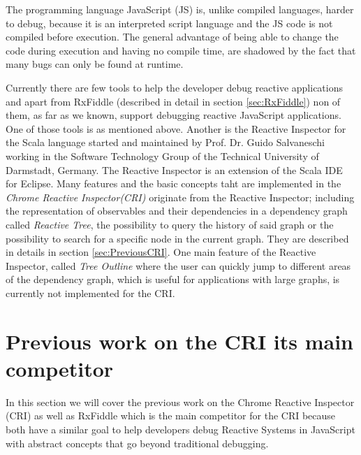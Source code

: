 
The programming language JavaScript (JS) is, unlike compiled languages, harder to debug, because it is an interpreted script language and the JS code is not compiled before execution. The general advantage of being able to change the code during execution and having no compile time, are shadowed by the fact that many bugs can only be found at runtime. 


Currently there are few tools to help the developer debug reactive applications and apart from RxFiddle (described in detail in section \ref{sec:RxFiddle}) non of them, as far as we known, support debugging reactive JavaScript applications. One of those tools is \cite{ShinyGraphFromLog} as mentioned above. Another is the Reactive Inspector for the Scala language \cite{ReactiveInspector} started and maintained by Prof. Dr. Guido Salvaneschi working in the Software Technology Group of the Technical University of Darmstadt, Germany.
The Reactive Inspector is an extension of the Scala IDE for Eclipse. Many features and the basic concepts taht are implemented in the \emph{Chrome Reactive Inspector(CRI)} originate from the Reactive Inspector; including the representation of observables and their dependencies in a dependency graph called \emph{Reactive Tree}, the possibility to query the history of said %
 graph or the possibility to search for a specific node in the current graph. They are described in details in section \ref{sec:PreviousCRI}. One main feature of the Reactive Inspector, called \emph{Tree Outline} where the user can quickly jump to different areas of the dependency graph, which is useful for applications with large graphs, is currently not implemented for the CRI.

\section{Previous work on the CRI its main competitor}
In this section we will cover the previous work on the Chrome Reactive Inspector (CRI) as well as RxFiddle which is the main competitor for the CRI because both have a similar goal to help developers debug Reactive Systems in JavaScript with abstract concepts that go beyond traditional debugging.

